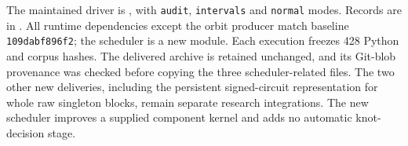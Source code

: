 

The maintained driver is , with
\texttt{audit}, \texttt{intervals} and \texttt{normal} modes. Records are in
. All runtime dependencies except the orbit
producer match baseline \texttt{109dabf896f2}; the scheduler is a new module.
Each execution freezes 428 Python and corpus hashes. The delivered archive
is retained unchanged, and its Git-blob provenance was checked before copying
the three scheduler-related files. The two other new deliveries, including
the persistent signed-circuit representation for whole raw singleton blocks,
remain separate research integrations. The new scheduler improves a supplied
component kernel and adds no automatic knot-decision stage.
